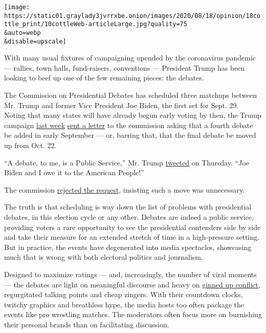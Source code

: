 \texttt{[image: https://static01.graylady3jvrrxbe.onion/images/2020/08/18/opinion/18cottle\_print/10cottleWeb-articleLarge.jpg?quality=75\\\&auto=webp\\\&disable=upscale]}

With many usual fixtures of campaigning upended by the coronavirus
pandemic --- rallies, town halls, fund-raisers, conventions ---
President Trump has been looking to beef up one of the few remaining
pieces: the debates.

The Commission on Presidential Debates has scheduled three matchups
between Mr. Trump and former Vice President Joe Biden, the first set for
Sept. 29. Noting that many states will have already begun early voting
by then, the Trump campaign
\href{https://cdn.donaldjtrump.com/public-files/press_assets/giuliani-debate-letter-8-5-20-1.pdf}{last
week}
\href{https://www.cnn.com/2020/08/05/politics/trump-campaign-four-debates/index.html}{sent
a letter} to the commission asking that a fourth debate be added in
early September --- or, barring that, that the final debate be moved up
from Oct. 22.

``A debate, to me, is a Public Service,'' Mr. Trump
\href{https://twitter.com/realdonaldtrump/status/1291339436727382016}{tweeted}
on Thursday. ``Joe Biden and I owe it to the American People!''

The commission
\href{https://www.nytimes3xbfgragh.onion/2020/08/06/us/politics/presidential-debates-trump-biden.html}{rejected
the request}, insisting such a move was unnecessary.

The truth is that scheduling is way down the list of problems with
presidential debates, in this election cycle or any other. Debates are
indeed a public service, providing voters a rare opportunity to see the
presidential contenders side by side and take their measure for an
extended stretch of time in a high-pressure setting. But in practice,
the events have degenerated into media spectacles, showcasing much that
is wrong with both electoral politics and journalism.

Designed to maximize ratings --- and, increasingly, the number of viral
moments --- the debates are light on meaningful discourse and heavy on
\href{https://variety.com/2020/tv/columns/democratic-debate-cnn-des-moines-register-sanders-warren-moderators-1203467552/}{ginned
up conflict}, regurgitated talking points and cheap zingers. With their
countdown clocks, twitchy graphics and breathless hype, the media hosts
too often package the events like pro wrestling matches. The moderators
often focus more on burnishing their personal brands than on
facilitating discussion.

